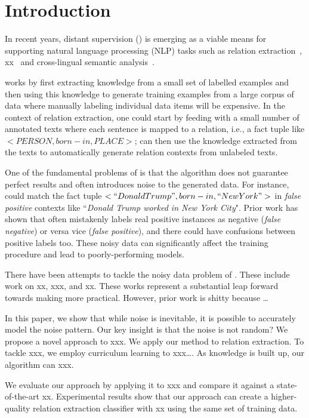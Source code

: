 \section{Introduction}

In recent years, distant supervision (\DS) is emerging as a viable means for
supporting natural language processing (NLP) tasks such as
relation extraction~\cite{mintz2009distant}, xx~\cite{} and cross-lingual
semantic analysis~\cite{fang2016learning}.

\DS works by first extracting knowledge from a small set of labelled examples
and then using this knowledge to generate training examples from a large corpus
of data where manually labeling individual data items will be
expensive. In the context of relation extraction, one could start by
feeding \DS with a small number of annotated texts where each sentence is
mapped to a relation, i.e., a fact tuple like $<PERSON, born-in, PLACE>$;
\DS can then use the knowledge extracted from the texts to automatically
generate relation contexts from unlabeled texts.

One of the fundamental problems of \DS is that the algorithm does not
guarantee perfect results and often introduces noise to the generated data.
For instance, \DS could match the fact tuple $<``Donald Trump", born-in,
``New York">$  in \emph{false positive} contexts like ``\emph{Donald Trump
worked in New York City}". Prior work has shown that \DS often mistakenly
labels real positive instances as negative (\emph{false negative}) or versa
vice (\emph{false positive}), and there could have confusions between
positive labels too. These noisy data can significantly affect the training
procedure and lead to poorly-performing models.

There have been attempts to tackle the noisy data problem of \DS. These
include work on xx, xxx, and xx. These works represent a substantial leap
forward towards making \DS more practical. However, prior work is shitty
because …

In this paper, we show that while noise is inevitable, it is possible to
accurately model the noise pattern. Our key insight is that the noise is not
random? We propose a novel approach to xxx. We apply our method to relation
extraction. To tackle xxx, we employ curriculum learning to xxx…. As
knowledge is built up, our algorithm can xxx.

We evaluate our approach by applying it to xxx and compare it against a
state-of-the-art xx. Experimental results show that our approach can create a
higher-quality relation extraction classifier with xx%
using the same set of training data.
